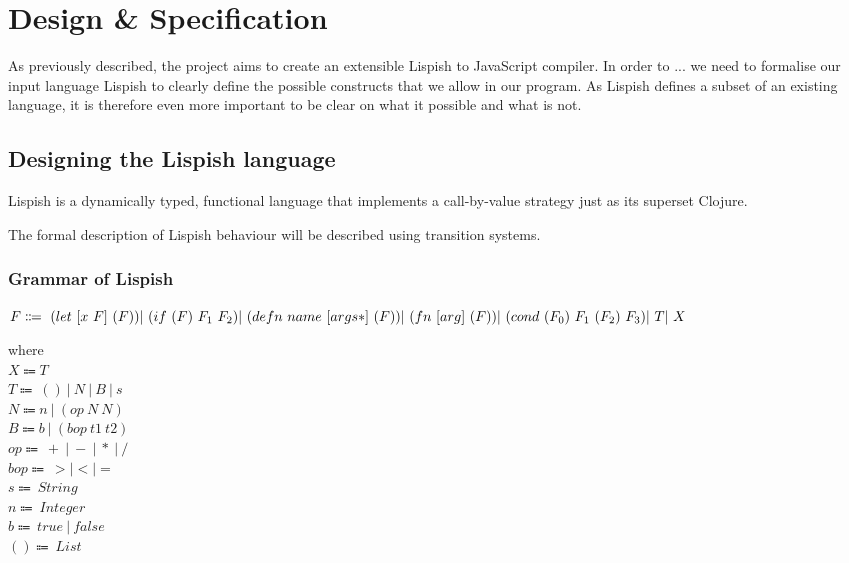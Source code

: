 \chapter{Design \& Specification}

As previously described, the project aims to create an extensible Lispish to JavaScript compiler. 
In order to ... we need to formalise our input language Lispish to clearly define the possible constructs that we allow in our program. 
As Lispish defines a subset of an existing language, it is therefore even more important to be clear on what it possible and what is not. 

\section{Designing the Lispish language}

Lispish is a dynamically typed, functional language that implements a call-by-value strategy just as its superset Clojure.

The formal description of Lispish behaviour will be described using transition systems.

\subsection{Grammar of Lispish}

$F \Coloneqq \ (let \ [x \ F] \ (F)) \\
| \	(if \ (F) \ F_1 \ F_2) \\
| \	(defn \ name \ [args*] \ (F)) \\
| \	(fn \ [arg] \ (F)) \\
| \	(cond \ (F_0) \ F_1 \ (F_2) \ F_3) \\
| \     T \\
| \     X
$

where
\\
$X \Coloneqq T $
\\
$T \Coloneqq \ () \ \vert \ N \ \vert \ B \ \vert \ s $
\\
$N \Coloneqq n \ \vert \ (op \ N \ N)  $
\\
$B \Coloneqq b\ \vert \ (bop \ t1 \ t2) \ $
\\
$op \Coloneqq \ + \ \vert \ - \ \vert \ * \ \vert \ /$
\\
$bop \Coloneqq \ > \vert < \vert =$
\\
$s \Coloneqq \ String $
\\
$n \Coloneqq \ Integer $
\\
$b \Coloneqq \ true \ \vert \ false $
\\
$() \Coloneqq \ List $


